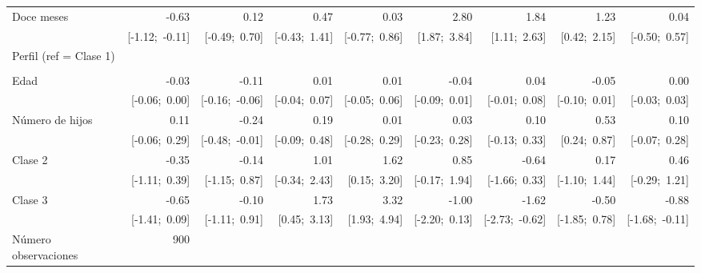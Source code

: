 \begin{sidewaystable}[htp]
\begin{center}
{\begin{tabular}{l D{.}{.}{3.11} D{.}{.}{3.11} D{.}{.}{3.11} D{.}{.}{3.11} D{.}{.}{3.11} D{.}{.}{3.11} D{.}{.}{3.11} D{.}{.}{3.11} }
\quad Doce meses           & -0.63           & 0.12            & 0.47            & 0.03            & 2.80            & 1.84            & 1.23            & 0.04            \\
                           & [-1.12;\ -0.11] & [-0.49;\ 0.70]  & [-0.43;\ 1.41]  & [-0.77;\ 0.86]  & [1.87;\ 3.84]   & [1.11;\ 2.63]   & [0.42;\ 2.15]   & [-0.50;\ 0.57]  \\
Perfil (ref = Clase 1)     &                 &                 &                 &                 &                 &                 &                 &                 \\
                           &                 &                 &                 &                 &                 &                 &                 &                 \\
\quad Edad                 & -0.03           & -0.11           & 0.01            & 0.01            & -0.04           & 0.04            & -0.05           & 0.00            \\
                           & [-0.06;\ 0.00]  & [-0.16;\ -0.06] & [-0.04;\ 0.07]  & [-0.05;\ 0.06]  & [-0.09;\ 0.01]  & [-0.01;\ 0.08]  & [-0.10;\ 0.01]  & [-0.03;\ 0.03]  \\
\quad Número de hijos      & 0.11            & -0.24           & 0.19            & 0.01            & 0.03            & 0.10            & 0.53            & 0.10            \\
                           & [-0.06;\ 0.29]  & [-0.48;\ -0.01] & [-0.09;\ 0.48]  & [-0.28;\ 0.29]  & [-0.23;\ 0.28]  & [-0.13;\ 0.33]  & [0.24;\ 0.87]   & [-0.07;\ 0.28]  \\
Clase 2                    & -0.35           & -0.14           & 1.01            & 1.62            & 0.85            & -0.64           & 0.17            & 0.46            \\
                           & [-1.11;\ 0.39]  & [-1.15;\ 0.87]  & [-0.34;\ 2.43]  & [0.15;\ 3.20]   & [-0.17;\ 1.94]  & [-1.66;\ 0.33]  & [-1.10;\ 1.44]  & [-0.29;\ 1.21]  \\
Clase 3                    & -0.65           & -0.10           & 1.73            & 3.32            & -1.00           & -1.62           & -0.50           & -0.88           \\
                           & [-1.41;\ 0.09]  & [-1.11;\ 0.91]  & [0.45;\ 3.13]   & [1.93;\ 4.94]   & [-2.20;\ 0.13]  & [-2.73;\ -0.62] & [-1.85;\ 0.78]  & [-1.68;\ -0.11] \\
\midrule
Número observaciones                  & 900             &                 &                 &                 &                 &                 &                 &                 \\

\end{tabular}}
\end{center}
\end{sidewaystable}
